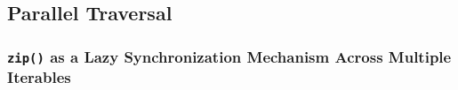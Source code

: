 \subsection{Parallel Traversal}
\subsubsection{\texttt{zip()} as a Lazy Synchronization Mechanism Across Multiple Iterables}
